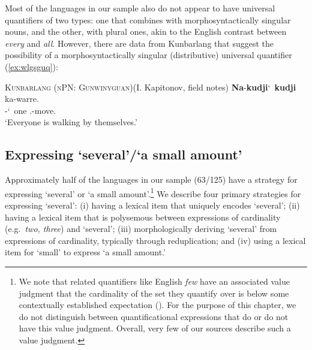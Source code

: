 \documentclass[12pt,egregdoesnotlikesansseriftitles]{scrartcl}
\newcommand{\ofy}{/125} %
\begin{document}
Most of the languages in our sample also do not appear to have universal quantifiers of two types: one that combines with morphosyntactically singular nouns, and the other, with plural ones, akin to the 
English contrast between \textit{every} and \textit{all}. However, there are data from Kunbarlang that suggest the possibility of a morphosyntactically singular (distributive) universal quantifier (\ref{ex:wlgsguq}):
\begin{exe}
  \ex\textsc{Kunbarlang (nPN: Gunwinyguan)}\hfill (I. Kapitonov, field notes)
  \gll \textbf{Na}-\textbf{kudji}\char`~\textbf{kudji} ka-warre.\\
  \Cli-\Rdp\char`~one \Tsg.\Nfut-move.\Np\\
  \glt `Everyone is walking by themselves.' %
\end{exe}



\subsection{Expressing `several'/`a small amount'}

Approximately half of the languages in our sample (63\ofy) have a strategy for expressing `several' or `a small amount'.\footnote{We note that related quantifiers like English \textit{few} have an associated value judgment that the cardinality of the set they quantify over is below some contextually established expectation (\citealt{keenan17qu}). For the purpose of this chapter, we do not distinguish between quantificational expressions that do or do not have this value judgment. Overall, very few of our sources describe such a value judgment.} We describe four primary strategies for expressing `several': (i) having a lexical item that uniquely encodes `several'; (ii) having a lexical item that is polysemous between expressions of cardinality (e.g.\ \textit{two, three}) and `several'; (iii) morphologically deriving `several' from expressions of cardinality, typically through reduplication; and (iv) using a lexical item for `small' to express `a small amount.'
\end{document}
